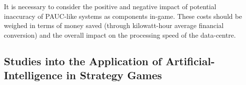 It is necessary to consider the positive and negative impact of potential inaccuracy of PAUC-like systems as components in-game. These costs should be weighed in terms of money saved (through kilowatt-hour average financial conversion) and the overall impact on the processing speed of the data-centre.






\subsection{Studies into the Application of Artificial-Intelligence in Strategy Games}
\label{sec:ACriticalReviewOfReleventScientificAndEngineeringLiturature:StudiesIntoTheApplicationOfArtificialIntelligenceInStrategyGames}

